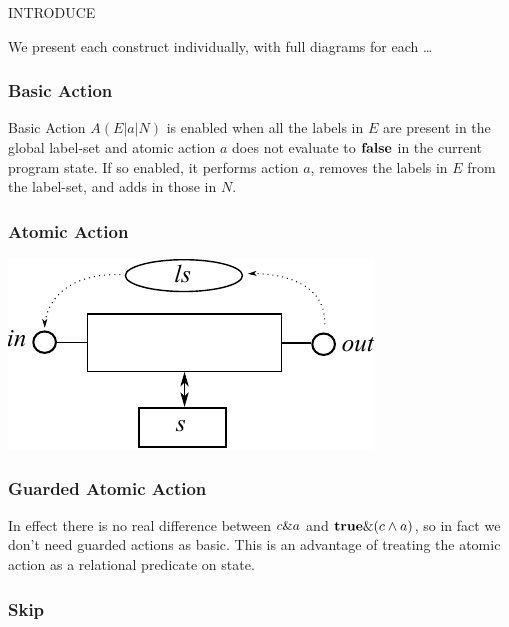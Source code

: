 INTRODUCE

We present each construct individually,
with full diagrams for each \dots



\subsubsection{Basic Action}

Basic Action $A(E|a|N)$ is enabled when all the labels in $E$
are present in the global label-set
and atomic action $a$ does not evaluate to $\mathbf{false}$
in the current program state.
If so enabled,  it performs action $a$, removes the labels in $E$
from the label-set, and adds in those in $N$.




\newpage
\subsubsection{Atomic Action}

\includegraphics{images/atomic-action}


\subsubsection{Guarded Atomic Action}
In effect there is no real difference between $c \& a$
and $\mathbf{true} \& (c \land a)$,
so in fact we don't need guarded actions as basic.
This is an advantage of treating the atomic action as a relational predicate
on state.



\subsubsection{Skip}

